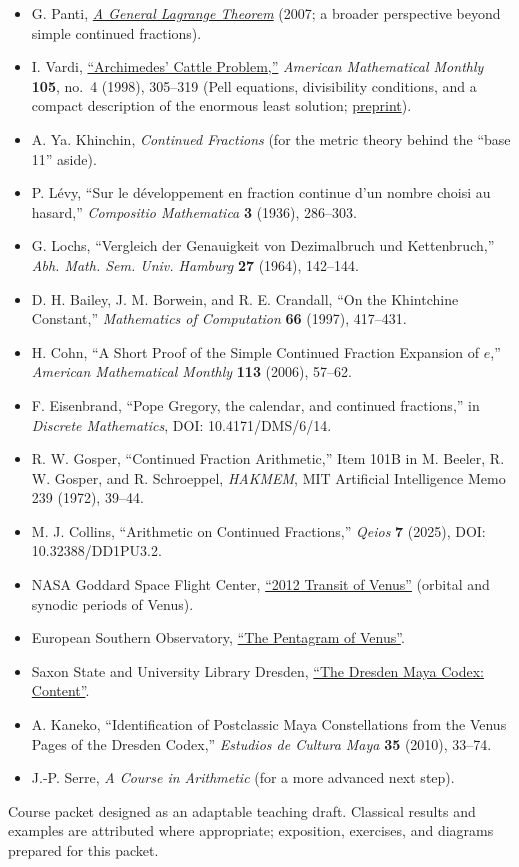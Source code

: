 \documentclass[11pt,oneside]{book}
\theoremstyle{course}
\theoremstyle{definition}
\begin{document}
\begin{itemize}[parsep=0pt,itemsep=2pt,topsep=4pt]
  (the distinction between Lagrange's theorem and Galois's criterion).
  \item G. Panti,
  \href{https://arxiv.org/abs/0712.2996}{\emph{A General Lagrange Theorem}}
  (2007; a broader perspective beyond simple continued fractions).
  \item I. Vardi,
  \href{https://doi.org/10.1080/00029890.1998.12004887}{``Archimedes' Cattle Problem,''}
  \emph{American Mathematical Monthly} \textbf{105}, no.~4 (1998), 305--319
  (Pell equations, divisibility conditions, and a compact description of
  the enormous least solution;
  \href{https://www.maths.tcd.ie/~lebed/Cattle\%20problem\%20Ilan\%20Vardi.pdf}{preprint}).
  \item A. Ya. Khinchin, \emph{Continued Fractions} (for the metric theory behind the ``base 11'' aside).
  \item P. L\'evy, ``Sur le d\'eveloppement en fraction continue d'un nombre choisi au hasard,'' \emph{Compositio Mathematica} \textbf{3} (1936), 286--303.
  \item G. Lochs, ``Vergleich der Genauigkeit von Dezimalbruch und Kettenbruch,'' \emph{Abh. Math. Sem. Univ. Hamburg} \textbf{27} (1964), 142--144.
  \item D. H. Bailey, J. M. Borwein, and R. E. Crandall, ``On the Khintchine Constant,'' \emph{Mathematics of Computation} \textbf{66} (1997), 417--431.
  \item H. Cohn, ``A Short Proof of the Simple Continued Fraction Expansion of $e$,'' \emph{American Mathematical Monthly} \textbf{113} (2006), 57--62.
  \item F. Eisenbrand, ``Pope Gregory, the calendar, and continued fractions,'' in \emph{Discrete Mathematics}, DOI: 10.4171/DMS/6/14.
  \item R. W. Gosper, ``Continued Fraction Arithmetic,'' Item 101B in M. Beeler,
  R. W. Gosper, and R. Schroeppel, \emph{HAKMEM}, MIT Artificial Intelligence
  Memo 239 (1972), 39--44.
  \item M. J. Collins, ``Arithmetic on Continued Fractions,'' \emph{Qeios}
  \textbf{7} (2025), DOI: 10.32388/DD1PU3.2.
  \item NASA Goddard Space Flight Center,
  \href{https://eclipse.gsfc.nasa.gov/OH/transit12.html}{``2012 Transit of Venus''}
  (orbital and synodic periods of Venus).
  \item European Southern Observatory,
  \href{https://www.eso.org/public/outreach/eduoff/vt-2004/Education/edu1app5.html}{``The Pentagram of Venus''}.
  \item Saxon State and University Library Dresden,
  \href{https://www.slub-dresden.de/en/explore/manuscripts/the-dresden-maya-codex/content}{``The Dresden Maya Codex: Content''}.
  \item A. Kaneko, ``Identification of Postclassic Maya Constellations from
  the Venus Pages of the Dresden Codex,'' \emph{Estudios de Cultura Maya}
  \textbf{35} (2010), 33--74.
  \item J.-P. Serre, \emph{A Course in Arithmetic} (for a more advanced next step).
\end{itemize}

\vfill
\begin{center}\color{muted}\small
Course packet designed as an adaptable teaching draft. Classical results
and examples are attributed where appropriate; exposition, exercises, and
diagrams prepared for this packet.
\end{center}
\end{document}
